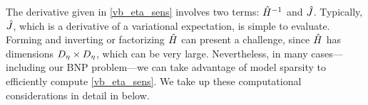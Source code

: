 The derivative given in \eqref{vb_eta_sens} involves two terms: $\hat{H}^{-1}$
and  $\hat J$.  Typically, $\hat J$, which is a derivative of a
variational expectation, is simple to evaluate.  Forming and inverting or
factorizing $\hat{H}$ can present a challenge, since $\hat{H}$ has dimensions
${D_{\eta}} \times {D_{\eta}}$, which can be very large.  Nevertheless, in many
cases---including our BNP problem---we can take advantage of model sparsity to
efficiently compute \eqref{vb_eta_sens}.  We take up these computational
considerations in detail in  below.
